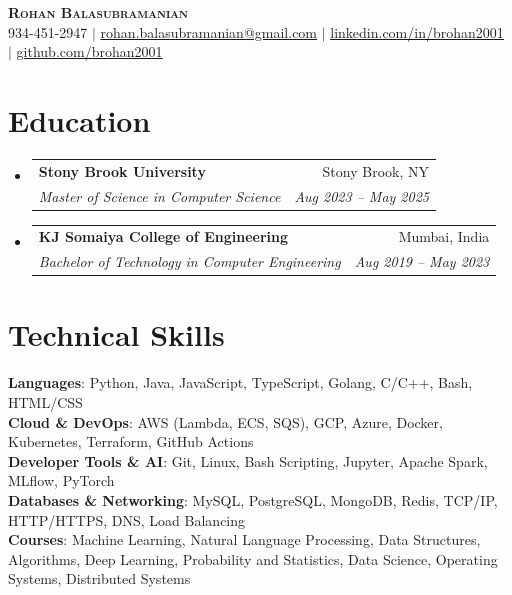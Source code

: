 \documentclass[letterpaper,11pt]{article}
\makeatletter
\newcommand{\resumeItem}[1]{
  \item\small{
    {#1 \vspace{-2pt}}
  }
}
\newcommand{\resumeSubheading}[4]{
  \vspace{-2pt}\item
    \begin{tabular*}{0.97\textwidth}[t]{l@{\extracolsep{\fill}}r}
      \textbf{#1} & #2 \\
      \textit{\small#3} & \textit{\small #4} \\
    \end{tabular*}\vspace{-7pt}
}
\newcommand{\resumeSubHeadingListStart}{\begin{itemize}[leftmargin=0.15in, label={}]}
\newcommand{\resumeSubHeadingListEnd}{\end{itemize}}
\newcommand{\resumeItemListStart}{\begin{itemize}}
\newcommand{\resumeItemListEnd}{\end{itemize}\vspace{-5pt}}
\makeatother
\begin{document}

\begin{center}
    \textbf{\Huge \scshape Rohan Balasubramanian} \\ \vspace{1pt}
    \small 934-451-2947 $|$ \href{mailto:rohan.balasubramanian@gmail.com}{\underline{rohan.balasubramanian@gmail.com}} $|$ 
    \href{https://www.linkedin.com/in/brohan2001/}{\underline{linkedin.com/in/brohan2001}} $|$
    \href{https://github.com/brohan2001}{\underline{github.com/brohan2001}}
\end{center}


\section{Education}
  \resumeSubHeadingListStart
    \resumeSubheading
      {Stony Brook University}{Stony Brook, NY}
      {Master of Science in Computer Science}{Aug 2023 -- May 2025}
    \resumeSubheading
      {KJ Somaiya College of Engineering}{Mumbai, India}
      {Bachelor of Technology in Computer Engineering}{Aug 2019 -- May 2023}
  \resumeSubHeadingListEnd

%
\section{Technical Skills}
 \begin{itemize}[leftmargin=0.15in, label={}]
    \small{\item{
     \textbf{Languages}{: Python, Java, JavaScript, TypeScript, Golang, C/C++, Bash, HTML/CSS} \\
     \textbf{Cloud \& DevOps}{: AWS (Lambda, ECS, SQS), GCP, Azure, Docker, Kubernetes, Terraform, GitHub Actions} \\
     \textbf{Developer Tools \& AI}{: Git, Linux, Bash Scripting, Jupyter, Apache Spark, MLflow, PyTorch} \\
     \textbf{Databases \& Networking}{: MySQL, PostgreSQL, MongoDB, Redis, TCP/IP, HTTP/HTTPS, DNS, Load Balancing} \\
     \textbf{Courses}{: Machine Learning, Natural Language Processing, Data Structures, Algorithms, Deep Learning, Probability and Statistics, Data Science, Operating Systems, Distributed Systems}\\
    }}
 \end{itemize}
\end{document}
